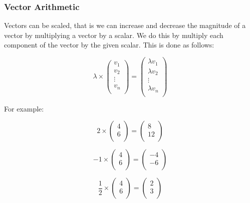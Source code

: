 \documentclass[a4paper,oneside]{report}
\begin{document}
\subsubsection{Vector Arithmetic}

Vectors can be scaled, that is we can increase and decrease the magnitude of a
vector by multiplying a vector by a scalar. We do this by multiply each
component of the vector by the given scalar. This is done as follows:

\[ \lambda \times \begin{pmatrix}
	v_1 \\
	v_2 \\
	\vdots \\
	v_n \\
\end{pmatrix} = \begin{pmatrix}
	\lambda v_1 \\
	\lambda v_2 \\
	\vdots \\
	\lambda v_n \\
\end{pmatrix} \]

For example:

\[ 2 \times \begin{pmatrix}
	4 \\
	6 \\
\end{pmatrix} = \begin{pmatrix}
	8 \\
	12 \\
\end{pmatrix} \]

\[ -1 \times \begin{pmatrix}
	4 \\
	6 \\
\end{pmatrix} = \begin{pmatrix}
	-4 \\
	-6 \\
\end{pmatrix} \]

\[ \frac{1}{2} \times \begin{pmatrix}
	4 \\
	6 \\
\end{pmatrix} = \begin{pmatrix}
	2 \\
	3 \\
\end{pmatrix} \]
\end{document}
